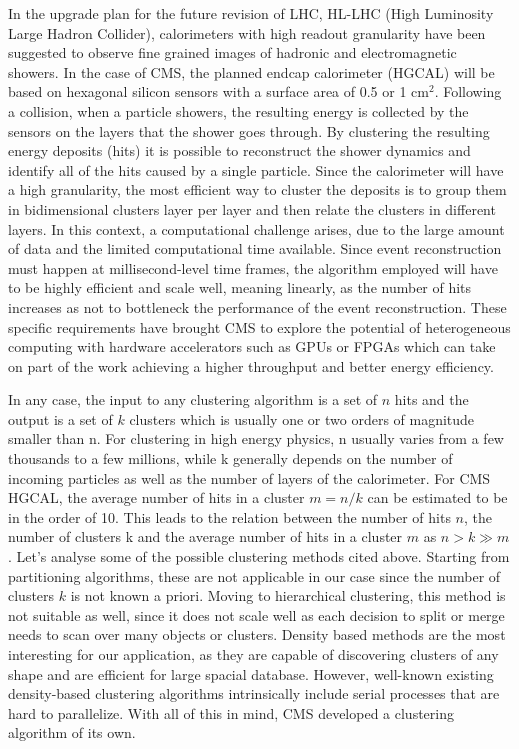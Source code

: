 In the upgrade plan for the future revision of LHC, HL-LHC (High Luminosity Large Hadron Collider), calorimeters with high readout granularity have been suggested to observe fine grained images of hadronic and electromagnetic showers\cite{high_granularity}. In the case of CMS, the planned endcap calorimeter (HGCAL) will be based on hexagonal silicon sensors with a surface area of 0.5 or 1 cm$^2$\cite{hgcal}. Following a collision, when a particle showers, the resulting energy is collected by the sensors on the layers that the shower goes through. By clustering the resulting energy deposits (hits) it is possible to reconstruct the shower dynamics and identify all of the hits caused by a single particle. Since the calorimeter will have a high granularity, the most efficient way to cluster the deposits is to group them in bidimensional clusters layer per layer\cite{2d} and then relate the clusters in different layers. In this context, a computational challenge arises, due to the large amount of data and the limited computational time available. Since event reconstruction must happen at millisecond-level time frames, the algorithm employed will have to be highly efficient and scale well, meaning linearly, as the number of hits increases as not to bottleneck the performance of the event reconstruction. These specific requirements have brought CMS to explore the potential of heterogeneous computing with hardware accelerators such as GPUs or FPGAs which can take on part of the work achieving a higher throughput and better energy efficiency. 

In any case, the input to any clustering algorithm is a set of $n$ hits and the output is a set of $k$ clusters which is usually one or two orders of magnitude smaller than n. For clustering in high energy physics, n usually varies from a few thousands to a few millions, while k generally depends on the number of incoming particles as well as the number of layers of the calorimeter. For CMS HGCAL, the average number of hits in a cluster $m=n/k$ can be estimated to be in the order of 10. This leads to the relation between the number of hits $n$, the number of clusters k and the average number of hits in a cluster $m$ as $n > k \gg m$. Let's analyse some of the possible clustering methods cited above. Starting from partitioning algorithms, these are not applicable in our case since the number of clusters $k$ is not known a priori. Moving to hierarchical clustering, this method is not suitable as well, since it does not scale well as each decision to split or merge needs to scan over many objects or clusters. Density based methods are the most interesting for our application, as they are capable of discovering clusters of any shape and are efficient for large spacial database. However, well-known existing density-based clustering algorithms intrinsically include serial processes that are hard to parallelize. With all of this in mind, CMS developed a clustering algorithm of its own.

